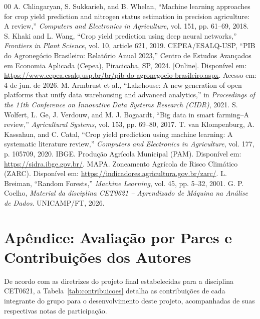 \documentclass[conference]{IEEEtran}
\begin{document}
\begin{thebibliography}{00}
 A. Chlingaryan, S. Sukkarieh, and B. Whelan, ``Machine learning approaches for crop yield prediction and nitrogen status estimation in precision agriculture: A review,'' \textit{Computers and Electronics in Agriculture}, vol. 151, pp. 61--69, 2018.
 S. Khaki and L. Wang, ``Crop yield prediction using deep neural networks,'' \textit{Frontiers in Plant Science}, vol. 10, article 621, 2019.
 CEPEA/ESALQ-USP, ``PIB do Agronegócio Brasileiro: Relatório Anual 2023,'' Centro de Estudos Avançados em Economia Aplicada (Cepea), Piracicaba, SP, 2024. [Online]. Disponível em: \url{https://www.cepea.esalq.usp.br/br/pib-do-agronegocio-brasileiro.aspx}. Acesso em: 4 de jun. de 2026.
 M. Armbrust et al., ``Lakehouse: A new generation of open platforms that unify data warehousing and advanced analytics,'' in \textit{Proceedings of the 11th Conference on Innovative Data Systems Research (CIDR)}, 2021.
 S. Wolfert, L. Ge, J. Verdouw, and M. J. Bogaardt, ``Big data in smart farming--A review,'' \textit{Agricultural Systems}, vol. 153, pp. 69--80, 2017.
 T. van Klompenburg, A. Kassahun, and C. Catal, ``Crop yield prediction using machine learning: A systematic literature review,'' \textit{Computers and Electronics in Agriculture}, vol. 177, p. 105709, 2020.
 IBGE. Produção Agrícola Municipal (PAM). Disponível em: \url{https://sidra.ibge.gov.br/}.
 MAPA. Zoneamento Agrícola de Risco Climático (ZARC). Disponível em: \url{https://indicadores.agricultura.gov.br/zarc/}.
 L. Breiman, ``Random Forests,'' \textit{Machine Learning}, vol. 45, pp. 5--32, 2001.
 G. P. Coelho, \textit{Material da disciplina CET0621 -- Aprendizado de Máquina na Análise de Dados}. UNICAMP/FT, 2026.
\end{thebibliography}

\newpage
\onecolumn
\section*{Apêndice: Avaliação por Pares e Contribuições dos Autores}

De acordo com as diretrizes do projeto final estabelecidas para a disciplina CET0621, a Tabela~\ref{tab:contribuicoes} detalha as contribuições de cada integrante do grupo para o desenvolvimento deste projeto, acompanhadas de suas respectivas notas de participação.
\end{document}
